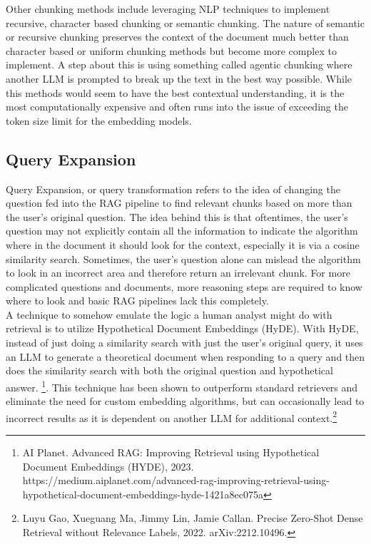 \documentclass{article}
\begin{document}
    \noindent Other chunking methods include leveraging NLP techniques to implement recursive, character based chunking or semantic chunking. The nature of semantic or recursive chunking preserves the context of the document much better than character based or uniform chunking methods but become more complex to implement. A step about this is using something called agentic chunking where another LLM is prompted to break up the text in the best way possible. While this methods would seem to have the best contextual understanding, it is the most computationally expensive and often runs into the issue of exceeding the token size limit for the embedding models. 


    \subsection{Query Expansion}
    Query Expansion, or query transformation refers to the idea of changing the question fed into the RAG pipeline to find relevant chunks based on more than the user's original question. The idea behind this is that oftentimes, the user's question may not explicitly contain all the information to indicate the algorithm where in the document it should look for the context, especially it is via a cosine similarity search. Sometimes, the user's question alone can mislead the algorithm to look in an incorrect area and therefore return an irrelevant chunk. For more complicated questions and documents, more reasoning steps are required to know where to look and basic RAG pipelines lack this completely. 
    \\
    
    \noindent A technique to somehow emulate the logic a human analyst might do with retrieval is to utilize Hypothetical Document Embeddings (HyDE). With HyDE, instead of just doing a similarity search with just the user's original query, it uses an LLM to generate a theoretical document when responding to a query and then does the similarity search with both the original question and hypothetical answer. \footnote{ AI Planet. Advanced RAG: Improving Retrieval using Hypothetical Document Embeddings (HYDE), 2023.  https://medium.aiplanet.com/advanced-rag-improving-retrieval-using-hypothetical-document-embeddings-hyde-1421a8ec075a}. This technique has been shown to outperform standard retrievers and eliminate the need for custom embedding algorithms, but can occasionally lead to incorrect results as it is dependent on another LLM for additional context.\footnote{Luyu Gao, Xueguang Ma, Jimmy Lin, Jamie Callan. Precise Zero-Shot Dense Retrieval without Relevance Labels, 2022. arXiv:2212.10496.}
\end{document}

